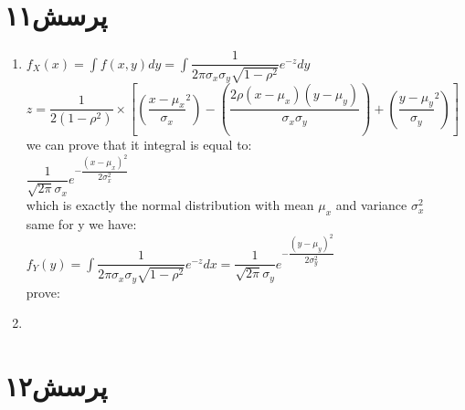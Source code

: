 \documentclass[a4paper]{article}
\begin{document}
\section*{پرسش۱۱}
\begin{latin}
\begin{enumerate}

\item{}
$f_X(x) = \int f(x,y)dy = \int \dfrac{1}{2\pi \sigma_x \sigma_y \sqrt{1-\rho^2}}e^{-z}dy$\\
$ z=\dfrac{1}{2(1-\rho^2)}\times[(\dfrac{x-\mu_x}{\sigma_x}^2)-(\dfrac{2\rho(x-\mu_x)(y-\mu_y)}{\sigma_x \sigma_y})+(\dfrac{y-\mu_y}{\sigma_y}^2)] $\\
we can prove that it integral is  equal to:\\
$ \dfrac{1}{\sqrt{2\pi}\sigma_x}e^{-\dfrac{(x-\mu_x)^2}{2\sigma_x^2}}$\\
which is exactly the normal distribution with mean $\mu_x$ and variance $\sigma_x^2$\\
same for y we have:\\
$f_Y(y) = \int \dfrac{1}{2\pi \sigma_x \sigma_y \sqrt{1-\rho^2}}e^{-z}dx = \dfrac{1}{\sqrt{2\pi}\sigma_y}e^{-\dfrac{(y-\mu_y)^2}{2\sigma_y^2}}$\\

prove:

\item{}

\end{enumerate}
\end{latin}

\pagebreak
\section*{پرسش۱۲}

\pagebreak
\end{document}
